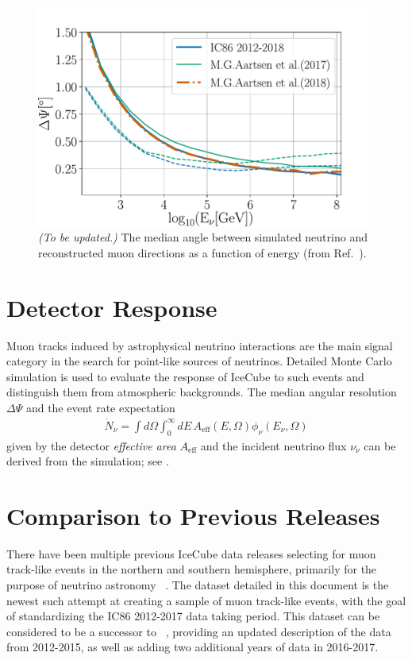 \documentclass[aps,10pt,prd,twocolumn,floats,letterpaper,showpacs,nofootinbib,bibnotes,notitlepage,superscriptaddress,floatfix]{revtex4-1}
\newcommand{\MA}[1]{{\color{magenta}#1}}
\begin{document}
\begin{figure}[t]
\centering
\includegraphics[width=\linewidth]{IC86II_PSF.pdf}
\caption[]{\MA{\it (To be updated.)} The median angle between simulated neutrino and reconstructed muon directions as a function of energy (from Ref.~\cite{Aartsen:2019fau}).}\label{fig:PSF}
\end{figure}

\section{Detector Response}

Muon tracks induced by astrophysical neutrino interactions are the main signal category in the search for point-like sources of neutrinos. Detailed Monte Carlo simulation is used to evaluate the response of IceCube to such events and distinguish them from atmospheric backgrounds. The median angular resolution $\Delta\Psi$ and the event rate expectation
\begin{align}\label{eq:ev_rate}
\dot{N}_\nu=\int d\Omega\int_0^\infty dE\,A_\mathrm{eff}\left(E, \Omega\right) \phi_\nu\left(E_\nu,\Omega\right)
\end{align}
given by the detector \emph{effective area} $A_\mathrm{eff}$ and the incident neutrino flux $\nu_\nu$ can be derived from the simulation; see \cite{Aartsen:2016xlq}.

\section{Comparison to Previous Releases}
There have been multiple previous IceCube data releases selecting for muon track-like events in the northern and southern hemisphere, primarily for the purpose of neutrino astronomy ~\cite{Abbasi:2010rd,Aartsen:2013uuv,IceCube:2018,IceCube:2019,IceCube:TXS2018}. The dataset detailed in this document is the newest such attempt at creating a sample of muon track-like events, with the goal of standardizing the IC86 2012-2017 data taking period. This dataset can be considered to be a successor to ~\cite{IceCube:2019}, providing an updated description of the data from 2012-2015, as well as adding two additional years of data in 2016-2017. 
\end{document}
